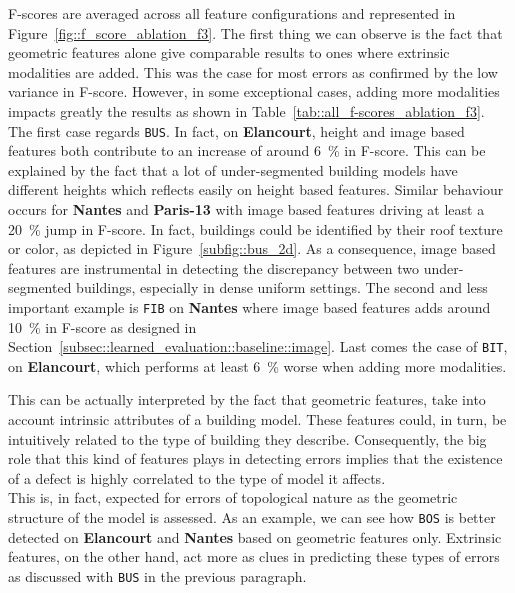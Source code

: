         F-scores are averaged across all feature configurations and represented in Figure~\ref{fig::f_score_ablation_f3}.
        The first thing we can observe is the fact that geometric features alone give comparable results to ones where extrinsic modalities are added.
        This was the case for most errors as confirmed by the low variance in F-score.
        However, in some exceptional cases, adding more modalities impacts greatly the results as shown in Table~\ref{tab::all_f-scores_ablation_f3}.
        The first case regards \texttt{BUS}.
        In fact, on \textbf{Elancourt}, height and image based features both contribute to an increase of around \SI{6}{\percent} in F-score.
        This can be explained by the fact that a lot of under-segmented building models have different heights which reflects easily on height based features.
        Similar behaviour occurs for \textbf{Nantes} and \textbf{Paris-13} with image based features driving at least a \SI{20}{\percent} jump in F-score.
        In fact, buildings could be identified by their roof texture or color, as depicted in Figure~\ref{subfig::bus_2d}.
        As a consequence, image based features are instrumental in detecting the discrepancy between two under-segmented buildings, especially in dense uniform settings.
        The second and less important example is \texttt{FIB} on \textbf{Nantes} where image based features adds around \SI{10}{\percent} in F-score as designed in Section~\ref{subsec::learned_evaluation::baseline::image}.
        Last comes the case of \texttt{BIT}, on \textbf{Elancourt}, which performs at least \SI{6}{\percent} worse when adding more modalities.

        This can be actually interpreted by the fact that geometric features, take into account intrinsic attributes of a building model.
        These features could, in turn, be intuitively related to the type of building they describe.
        Consequently, the big role that this kind of features plays in detecting errors implies that the existence of a defect is highly correlated to the type of model it affects.\\
        This is, in fact, expected for errors of topological nature as the geometric structure of the model is assessed.
        As an example, we can see how \texttt{BOS} is better detected on \textbf{Elancourt} and \textbf{Nantes} based on geometric features only.
        Extrinsic features, on the other hand, act more as clues in predicting these types of errors as discussed with \texttt{BUS} in the previous paragraph.\\

